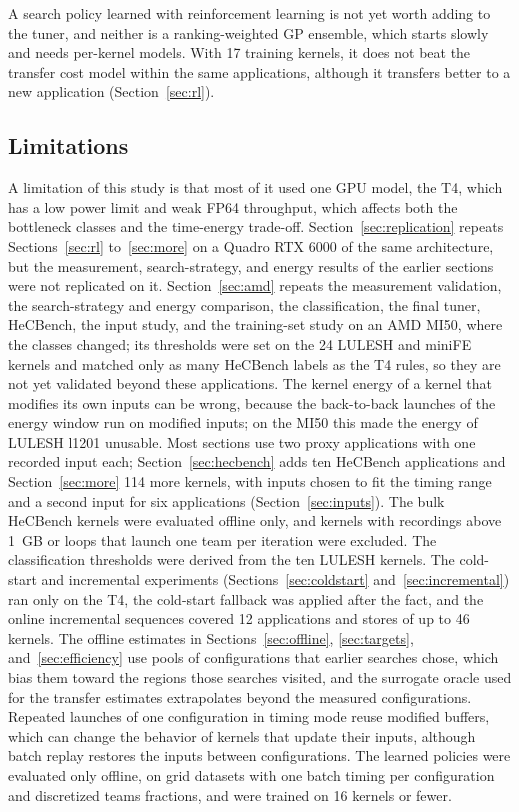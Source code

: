 \documentclass[10pt]{article}
\begin{document}
A search policy learned with reinforcement learning is not yet worth adding
to the tuner, and neither is a ranking-weighted GP ensemble, which starts
slowly and needs per-kernel models. With 17 training kernels, it does not beat the transfer cost
model within the same applications, although it transfers better to a new
application (Section~\ref{sec:rl}).

\subsection{Limitations}
A limitation of this study is that most of it used one GPU model, the T4, which
has a low power limit and weak FP64 throughput, which affects both the
bottleneck classes and the time-energy trade-off. Section~\ref{sec:replication}
repeats Sections~\ref{sec:rl} to~\ref{sec:more} on a Quadro RTX 6000 of the same
architecture, but the measurement, search-strategy, and energy results of the
earlier sections were not replicated on it. Section~\ref{sec:amd} repeats the
measurement validation, the search-strategy and energy comparison, the
classification, the final tuner, HeCBench, the input study, and the
training-set study on an AMD MI50, where the classes changed; its thresholds
were set on the 24 LULESH and miniFE kernels and matched only as many HeCBench
labels as the T4 rules, so they are not yet validated beyond these
applications. The kernel energy of a kernel that modifies its own inputs can be
wrong, because the back-to-back launches of the energy window run on modified
inputs; on the MI50 this made the energy of LULESH l1201 unusable. Most sections use two proxy
applications with one recorded input each; Section~\ref{sec:hecbench} adds ten
HeCBench applications and Section~\ref{sec:more} 114 more kernels, with inputs
chosen to fit the timing range and a second input for six applications
(Section~\ref{sec:inputs}). The bulk HeCBench kernels were evaluated offline
only, and kernels with recordings above 1~GB or loops that launch one team per
iteration were excluded. The classification thresholds were derived from the ten
LULESH kernels. The cold-start and incremental experiments
(Sections~\ref{sec:coldstart} and~\ref{sec:incremental}) ran only on the T4, the
cold-start fallback was applied after the fact, and the online incremental
sequences covered 12 applications and stores of up to 46 kernels.
The offline estimates in Sections~\ref{sec:offline}, \ref{sec:targets},
and~\ref{sec:efficiency} use pools of configurations that earlier searches
chose, which bias them toward the regions those searches visited, and the
surrogate oracle used for the transfer estimates extrapolates beyond the
measured configurations. Repeated launches of one configuration in timing
mode reuse modified buffers, which can change the behavior of kernels that
update their inputs, although batch replay restores the inputs between
configurations. The learned policies were evaluated only offline, on
grid datasets with one batch timing per configuration and
discretized teams fractions, and were trained on 16 kernels or fewer.
\end{document}
